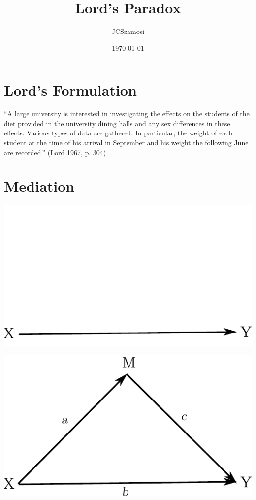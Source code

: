 \documentclass[xcolor=dvipsnames]{beamer}
\title[Lord's Paradox]{Lord's Paradox}
\author{JCSzamosi}
\institute[FMF]{McMaster University Farncombe Metagenomics Facility}
\date{\today}
\begin{document}
\begin{frame}
\titlepage
\end{frame}

\begin{frame}[plain]
\tableofcontents
\end{frame}

\section{Lord's Formulation}
\begin{frame}
``A large university is interested in investigating the effects on the students
of the diet provided in the university dining halls and any sex differences in
these effects. Various types of data are gathered. In particular, the weight of
each student at the time of his arrival in September and his weight the
following June are recorded.'' (Lord 1967, p. 304)
\end{frame}

\section{Mediation}
\begin{frame}
\includegraphics{arrow_diag_1.pdf}
\end{frame}

\begin{frame}{}
\includegraphics{arrow_diag_2.pdf}
\end{frame}
\end{document}
